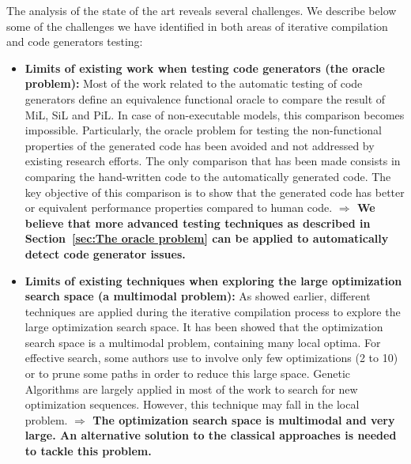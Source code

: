 The analysis of the state of the art reveals several challenges. We describe below some of the challenges we have identified in both areas of iterative compilation and code generators testing:
\begin{itemize}
	
\item \textbf{Limits of existing work when testing code generators (the oracle problem):} Most of the work related to the automatic testing of code generators define an equivalence functional oracle to compare the result of MiL, SiL and PiL. In case of non-executable models, this comparison becomes impossible. Particularly, the oracle problem for testing the non-functional properties of the generated code  has been avoided and not addressed by existing research efforts. The only comparison that has been made consists in comparing the hand-written code to the automatically generated code. The key objective of this comparison is to show that the generated code has better or equivalent performance properties compared to  human code.\newline
\textbf{$\Rightarrow$ 
	We believe that more advanced testing techniques as described in  Section~\ref{sec:The oracle problem} can be applied to automatically detect code generator issues.}
	
\item \textbf{Limits of existing techniques when exploring the large optimization search space (a multimodal problem):}
As showed earlier, different techniques are applied during the iterative compilation process to explore the large optimization search space. It has been showed that the optimization search space is a multimodal problem, containing many local optima.
For effective search, some authors use to involve only few optimizations (2 to 10) or to prune some paths in order to reduce this large  space.
Genetic Algorithms are largely applied in most of the work to search for new optimization sequences. However, this technique may fall in the local  problem. 
\newline
\textbf{$\Rightarrow$ The optimization search space is multimodal and very large. An alternative solution to the classical approaches is needed to tackle this problem.}
	

\end{itemize}
